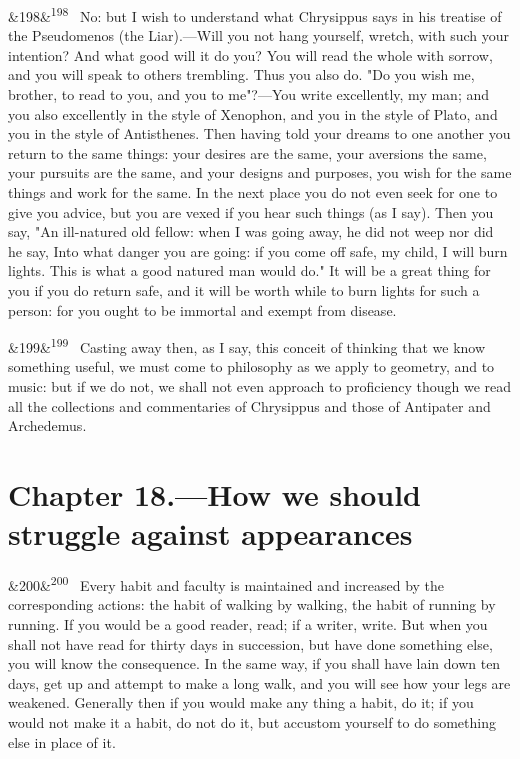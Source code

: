 \documentclass[12pt]{article}
\newcommand{\para}[1][]{\par\noindent\ifx&#1&\else\textsuperscript{\footnotesize #1}~\fi}
\begin{document}
\para[198] No: but I wish to understand what Chrysippus says in his treatise of the Pseudomenos (the Liar).—Will you not hang yourself, wretch, with such your intention? And what good will it do you? You will read the whole with sorrow, and you will speak to others trembling. Thus you also do. "Do you wish me, brother, to read to you, and you to me"?—You write excellently, my man; and you also excellently in the style of Xenophon, and you in the style of Plato, and you in the style of Antisthenes. Then having told your dreams to one another you return to the same things: your desires are the same, your aversions the same, your pursuits are the same, and your designs and purposes, you wish for the same things and work for the same. In the next place you do not even seek for one to give you advice, but you are vexed if you hear such things (as I say). Then you say, "An ill-natured old fellow: when I was going away, he did not weep nor did he say, Into what danger you are going: if you come off safe, my child, I will burn lights. This is what a good natured man would do." It will be a great thing for you if you do return safe, and it will be worth while to burn lights for such a person: for you ought to be immortal and exempt from disease.

\para[199] Casting away then, as I say, this conceit of thinking that we know something useful, we must come to philosophy as we apply to geometry, and to music: but if we do not, we shall not even approach to proficiency though we read all the collections and commentaries of Chrysippus and those of Antipater and Archedemus.

\section*{Chapter 18.---How we should struggle against appearances}

\para[200] Every habit and faculty is maintained and increased by the corresponding actions: the habit of walking by walking, the habit of running by running. If you would be a good reader, read; if a writer, write. But when you shall not have read for thirty days in succession, but have done something else, you will know the consequence. In the same way, if you shall have lain down ten days, get up and attempt to make a long walk, and you will see how your legs are weakened. Generally then if you would make any thing a habit, do it; if you would not make it a habit, do not do it, but accustom yourself to do something else in place of it.
\end{document}
